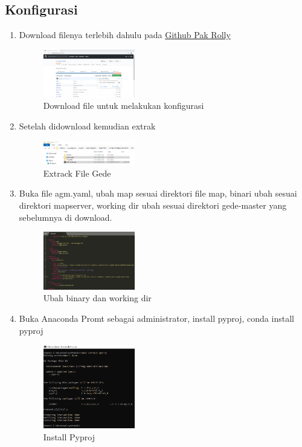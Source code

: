 \subsection{Konfigurasi}
\begin{enumerate}
    \item Download filenya terlebih dahulu pada \href{https://github.com/awangga/gede}{Github Pak Rolly}
    \hfill\break
    \begin{figure}[H]
		\includegraphics[width=4cm]{figures/1174008/5/2.png}
		\centering
		\caption{Download file untuk melakukan konfigurasi}
    \end{figure}

    \item Setelah didownload kemudian extrak
    \hfill\break
    \begin{figure}[H]
		\includegraphics[width=4cm]{figures/1174008/5/3.png}
		\centering
		\caption{Extrack File Gede}
    \end{figure}
    \item Buka file agm.yaml, ubah map sesuai direktori file map, binari ubah sesuai direktori mapserver, working dir ubah sesuai direktori gede-master yang sebelumnya di download.
    \hfill\break
    \begin{figure}[H]
		\includegraphics[width=4cm]{figures/1174008/5/4.png}
		\centering
		\caption{Ubah binary dan working dir}
    \end{figure}

    \item Buka Anaconda Promt sebagai administrator, install pyproj, conda install pyproj
    \hfill\break
    \begin{figure}[H]
		\includegraphics[width=4cm]{figures/1174008/5/5.png}
		\centering
		\caption{Install Pyproj}
    \end{figure} 

\end{enumerate}

